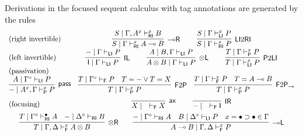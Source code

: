 \documentclass[submission,copyright,creativecommons]{eptcs}
\theoremstyle{definition}
\newtheorem{defn}{Definition}[section]
\newcommand{\tl}{\otimes \mathsf{L}}
\newcommand{\tr}{\otimes \mathsf{R}}
\newcommand{\lright}{{\multimap}\mathsf{R}}
\newcommand{\lleft}{{\multimap}\mathsf{L}}
\newcommand{\pass}{\mathsf{pass}}
\newcommand{\unitl}{\mathsf{IL}}
\newcommand{\unitr}{\mathsf{IR}}
\newcommand{\ax}{\mathsf{ax}}
\newcommand{\ot}{\otimes}
\newcommand{\lolli}{\multimap}
\newcommand{\I}{\mathsf{I}}
\newcommand{\RI}{\mathsf{RI}}
\newcommand{\LI}{\mathsf{LI}}
\newcommand{\Pass}{\mathsf{P}}
\newcommand{\F}{\mathsf{F}}
\newcommand{\xvdash}{\vdash^{x}}
\newcommand{\proofbox}[1]{\begin{tabular}{l} #1 \end{tabular}}
\newcommand{\NMILL}{\texttt{NMILL}}
\newcommand{\SkNMILL}{\NMILL\textsuperscript{\textit{s}}}
\newcommand{\FSkMCC}{\mathsf{Free}}
\begin{document}
Derivations in the focused sequent calculus with tag annotations are generated by the rules
\begin{equation}\label{eq:focus}
  \begin{array}{lc}
    \text{(right invertible)} & %
    \proofbox{
      \infer[\lright]{S \mid \Gamma \vdash^{x}_{\RI} A \lolli B}{S \mid \Gamma , A^{x} \vdash^{x}_{\RI} B}
    \qquad
    \infer[\LI 2 \RI]{S \mid \Gamma \vdash^{x}_{\RI} P}{S \mid \Gamma \vdash^{x}_{\LI} P}
    }
    \\[6pt]
    \text{(left invertible)} & %
    \proofbox{
      \infer[\unitl]{\I \mid \Gamma \vdash_{\LI} P}{- \mid \Gamma \vdash_{\LI} P}
    \qquad
    \infer[\tl]{A \ot B \mid \Gamma \vdash_{\LI} P}{A \mid B , \Gamma \vdash_{\LI} P}
    \qquad
    \infer[\Pass 2 \LI]{T \mid \Gamma \xvdash_{\LI} P}{T \mid \Gamma \xvdash_{\Pass} P}
    }
    \\
    \text{(passivation)} & \\ %
   \multicolumn{2}{c}{
    \infer[\pass]{- \mid A^{x} , \Gamma \xvdash_{\Pass} P }{
      A\mid \Gamma^{\circ} \vdash_{\LI} P
    }
    \quad
%    
    \infer[\F 2 \Pass]{T \mid \Gamma \xvdash_{\Pass} P}{
      T \mid \Gamma^\circ \vdash_{\F} P &
      T = - \vee T = X
    }
    \quad
    \infer[\F 2 \Pass_{{\lolli}}]{T \mid \Gamma \xvdash_{\Pass} P}{
      T \mid \Gamma \xvdash_{\F} P &
      T = A \lolli B
    }
    }
    \\[6pt]
    \text{(focusing)} &    %
    \proofbox{\infer[\ax]{X \mid \quad \vdash_{\F} X}{}
    \qquad
    \infer[\unitr]{- \mid \quad \vdash_{\F} \I}{}
    }
    \\[6pt]
    \multicolumn{2}{c}{
    \infer[\tr]{T \mid \Gamma , \Delta \xvdash_{\F} A \ot B}{
      T \mid \Gamma^{\circ} \vdash^{\bullet}_{\RI} A
      &
      - \mid \Delta^{\circ} \vdash_{\RI} B
    }
    \qquad
    \infer[\lleft]{A \lolli B \mid \Gamma , \Delta \xvdash_{\F} P}{
      - \mid \Gamma^{\circ} \vdash_{\RI} A
      &
      B \mid \Delta^{\circ} \vdash_{\LI} P
      &
      x = \bullet \supset \bullet \in \Gamma
    }
    }
  \end{array}
\end{equation}
\end{document}
